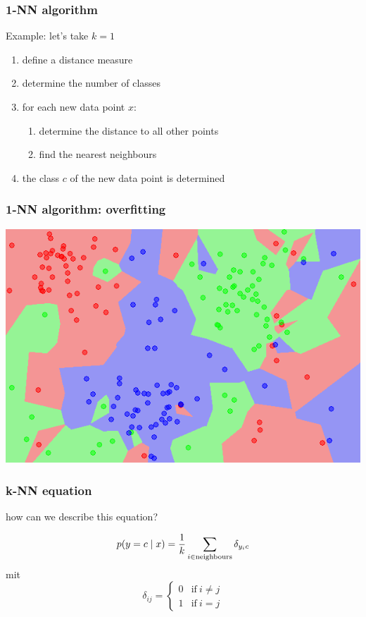 \documentclass[USenglish,pdftex,compress,10pt,svgnamesi]{beamer}%
\begin{document}
\begin{frame}
\frametitle{1-NN algorithm}

Example: let's take $k=1$

\begin{enumerate}
\item define a distance measure
\item determine the number of classes
\item for each new data point $x$:
	\begin{enumerate}
	\item determine the distance to all other points
	\item find the nearest neighbours
	\end{enumerate}
\item the class $c$ of the new data point is determined
\end{enumerate}
\end{frame}



\begin{frame}
\frametitle{1-NN algorithm: overfitting}

 \includegraphics[width=\textwidth]{knn1}

\end{frame}



\begin{frame}
\frametitle{k-NN equation}

how can we describe this equation?

\pause

$$p(y = c \mid x) = {1 \over k} \sum_{i \in \mathrm{neighbours}} \delta_{y_ic}$$
mit
$$\delta_{ij} = \begin{cases}0 &\mathrm{if\ } i \neq j \\ 1 &\mathrm{if\ } i = j\end{cases}$$

\end{frame}
\end{document}
